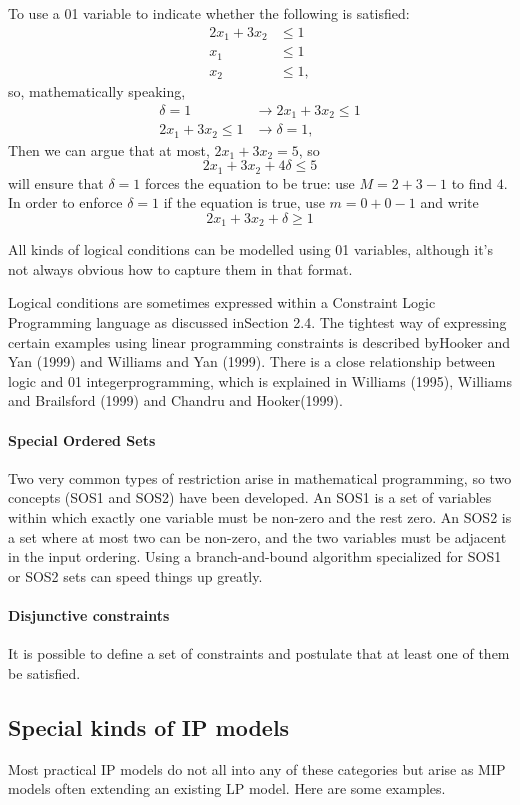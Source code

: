 \documentclass[13pt, letterpaper, twoside]{book}
\begin{document}
To use a 01 variable to indicate whether the following is satisfied:
\begin{align}
2x_1 + 3x_2 &\leq 1\\
x_1 &\leq 1\\
x_2 &\leq 1,
\end{align}
so, mathematically speaking,
\begin{align}
\delta = 1 &\rightarrow 2x_1 + 3x_2 \leq 1\\
2x_1 + 3x_2 \leq 1 &\rightarrow \delta = 1,
\end{align}
Then we can argue that at most, $2x_1 + 3x_2 = 5$, so
\[
2x_1 + 3x_2 + 4\delta \leq 5
\]
will ensure that $\delta = 1$ forces the equation to be true: use $M = 2 + 3 - 1$ to find $4$. In order to enforce $\delta = 1$ if the equation is true, use $m = 0 + 0 -1$ and write
\[
2x_1 + 3x_2 + \delta \geq 1
\]

All kinds of logical conditions can be modelled using 01 variables, although it's not always obvious how to capture them in that format. 

Logical conditions are sometimes expressed within a Constraint Logic Programming language as discussed inSection 2.4. The tightest way of expressing certain examples using linear programming constraints is described byHooker and Yan (1999) and Williams and Yan (1999). There is a close relationship between logic and 01 integerprogramming, which is explained in Williams (1995), Williams and Brailsford (1999) and Chandru and Hooker(1999).

\paragraph*{Special Ordered Sets}
Two very common types of restriction arise in mathematical programming, so two concepts (SOS1 and SOS2) have been developed. An SOS1 is a set of variables within which exactly one variable must be non-zero and the rest zero. An SOS2 is a set where at most two can be non-zero, and the two variables must be adjacent in the input ordering. Using a branch-and-bound algorithm specialized for SOS1 or SOS2 sets can speed things up greatly.

\paragraph*{Disjunctive constraints}
It is possible to define a set of constraints and postulate that at least one of them be satisfied.

\subsection{Special kinds of IP models}
Most practical IP models do not all into any of these categories but arise as MIP models often extending an existing LP model. Here are some examples.
\end{document}

